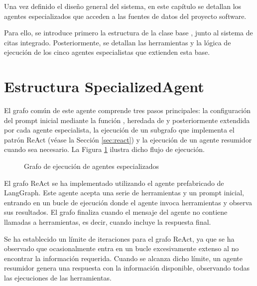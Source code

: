 Una vez definido el diseño general del sistema, en este capítulo se detallan los agentes especializados que acceden a las fuentes de datos del proyecto software.

Para ello, se introduce primero la estructura de la clase base , junto al sistema de citas integrado. Posteriormente, se detallan las herramientas y la lógica de ejecución de los cinco agentes especialistas que extienden esta base.

\section{Estructura SpecializedAgent}
El grafo común de este agente comprende tres pasos principales: la configuración del prompt inicial mediante la función , heredada de  y posteriormente extendida por cada agente especialista, la ejecución de un subgrafo que implementa el patrón ReAct (véase la Sección \ref{sec:react}) y la ejecución de un agente resumidor cuando sea necesario. La Figura \ref{fig:specialized} ilustra dicho flujo de ejecución.

\begin{figure}[h]
  \centering
  \caption{Grafo de ejecución de agentes especializados}
  \label{fig:specialized}
\end{figure}

El grafo ReAct se ha implementado utilizando el agente prefabricado  de LangGraph. Este agente acepta una serie de herramientas y un prompt inicial, entrando en un bucle de ejecución donde el agente invoca herramientas y observa sus resultados. El grafo finaliza cuando el mensaje del agente no contiene llamadas a herramientas, es decir, cuando incluye la respuesta final.

Se ha establecido un límite de iteraciones para el grafo ReAct, ya que se ha observado que ocasionalmente entra en un bucle excesivamente extenso al no encontrar la información requerida. Cuando se alcanza dicho límite, un agente resumidor genera una respuesta con la información disponible, observando todas las ejecuciones de las herramientas. 

